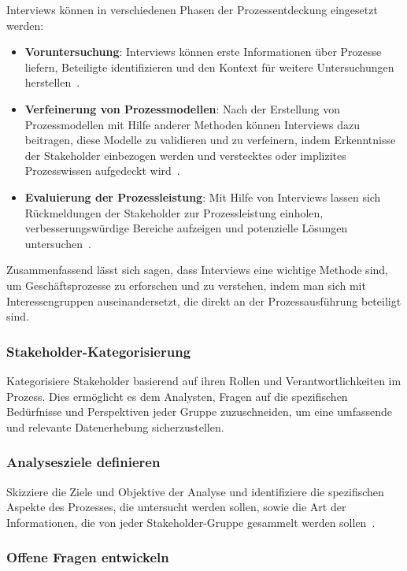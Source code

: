 Interviews können in verschiedenen Phasen der Prozessentdeckung eingesetzt werden:

\begin{itemize}
    \item \textbf{Voruntersuchung}: Interviews können erste Informationen über Prozesse liefern, Beteiligte identifizieren und den Kontext für weitere Untersuchungen herstellen~\cite{Dumas2013}.
    \item \textbf{Verfeinerung von Prozessmodellen}: Nach der Erstellung von Prozessmodellen mit Hilfe anderer Methoden können Interviews dazu beitragen, diese Modelle zu validieren und zu verfeinern, indem Erkenntnisse der Stakeholder einbezogen werden und verstecktes oder implizites Prozesswissen aufgedeckt wird~\cite{Dumas2013}.
    \item \textbf{Evaluierung der Prozessleistung}: Mit Hilfe von Interviews lassen sich Rückmeldungen der Stakeholder zur Prozessleistung einholen, verbesserungswürdige Bereiche aufzeigen und potenzielle Lösungen untersuchen~\cite{Dumas2013}.
\end{itemize}

Zusammenfassend lässt sich sagen, dass Interviews eine wichtige Methode sind, um Geschäftsprozesse zu erforschen und zu verstehen, indem man sich mit Interessengruppen auseinandersetzt, die direkt an der Prozessausführung beteiligt sind. 

\subsubsection{Stakeholder-Kategorisierung}

Kategorisiere Stakeholder basierend auf ihren Rollen und Verantwortlichkeiten im Prozess.
Dies ermöglicht es dem Analysten, Fragen auf die spezifischen Bedürfnisse und Perspektiven jeder Gruppe zuzuschneiden, um eine umfassende und relevante Datenerhebung sicherzustellen\cite{Dumas2013}.

\subsubsection{Analysesziele definieren}

Skizziere die Ziele und Objektive der Analyse und identifiziere die spezifischen Aspekte des Prozesses, die untersucht werden sollen, sowie die Art der Informationen, die von jeder Stakeholder-Gruppe gesammelt werden sollen~\cite{Seidman2006}.

\subsubsection{Offene Fragen entwickeln}

